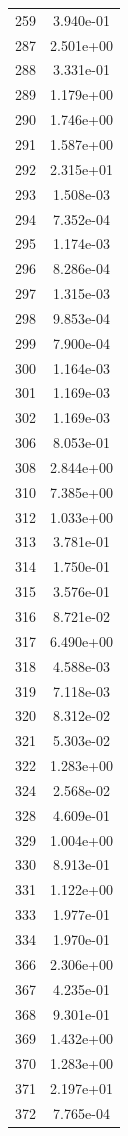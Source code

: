 \documentclass[12pt]{article}
\begin{document}
\begin{longtable}{@{}cc@{}}
259 & 3.940e-01 \\
287 & 2.501e+00 \\
288 & 3.331e-01 \\
289 & 1.179e+00 \\
290 & 1.746e+00 \\
291 & 1.587e+00 \\
292 & 2.315e+01 \\
293 & 1.508e-03 \\
294 & 7.352e-04 \\
295 & 1.174e-03 \\
296 & 8.286e-04 \\
297 & 1.315e-03 \\
298 & 9.853e-04 \\
299 & 7.900e-04 \\
300 & 1.164e-03 \\
301 & 1.169e-03 \\
302 & 1.169e-03 \\
306 & 8.053e-01 \\
308 & 2.844e+00 \\
310 & 7.385e+00 \\
312 & 1.033e+00 \\
313 & 3.781e-01 \\
314 & 1.750e-01 \\
315 & 3.576e-01 \\
316 & 8.721e-02 \\
317 & 6.490e+00 \\
318 & 4.588e-03 \\
319 & 7.118e-03 \\
320 & 8.312e-02 \\
321 & 5.303e-02 \\
322 & 1.283e+00 \\
324 & 2.568e-02 \\
328 & 4.609e-01 \\
329 & 1.004e+00 \\
330 & 8.913e-01 \\
331 & 1.122e+00 \\
333 & 1.977e-01 \\
334 & 1.970e-01 \\
366 & 2.306e+00 \\
367 & 4.235e-01 \\
368 & 9.301e-01 \\
369 & 1.432e+00 \\
370 & 1.283e+00 \\
371 & 2.197e+01 \\
372 & 7.765e-04 \\

\end{longtable}
\end{document}
